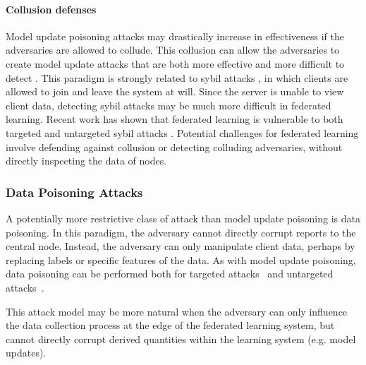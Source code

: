 \paragraph{Collusion defenses} Model update poisoning attacks may drastically increase in effectiveness if the adversaries are allowed to collude. This collusion can allow the adversaries to create model update attacks that are both more effective and more difficult to detect \citep{baruch2019little}. This paradigm is strongly related to sybil attacks \citep{sybil-attack}, in which clients are allowed to join and leave the system at will. Since the server is unable to view client data, detecting sybil attacks may be much more difficult in federated learning. Recent work has shown that federated learning is vulnerable to both targeted and untargeted sybil attacks \citep{fung2018mitigating}. Potential challenges for federated learning involve defending against collusion or detecting colluding adversaries, without directly inspecting the data of nodes.

\subsubsection{Data Poisoning Attacks}
\label{subsubsec:data_poisoning}


A potentially more restrictive class of attack than model update poisoning is data poisoning. In this paradigm, the adversary cannot directly corrupt reports to the central node. Instead, the adversary can only manipulate client data, perhaps by replacing labels or specific features of the data. As with model update poisoning, data poisoning can be performed both for targeted attacks~\citep{Biggio:2012:PAA:3042573.3042761, chen2017targeted, koh2017understanding} and untargeted attacks~\citep{DBLP:conf/ndss/LiuMALZW018, bagdasaryan18backdoor}.

This attack model may be more natural when the adversary can only influence the data collection process at the edge of the federated learning system, but cannot directly corrupt derived quantities within the learning system (e.g. model updates).

